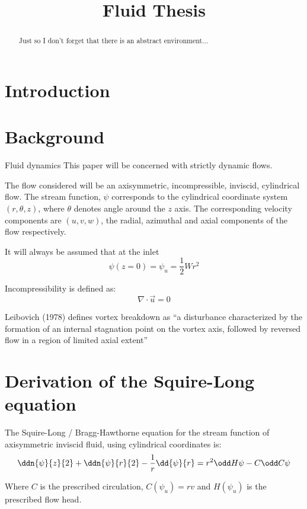 \documentclass{X:/Documents/Coding/Latex/myreport}
\title{Fluid Thesis}
\begin{document}
\maketitle
\begin{abstract}
    Just so I don't forget that there is an abstract environment...
\end{abstract}
\clearpage
\tableofcontents
\section{Introduction}

\section{Background}
Fluid dynamics 
This paper will be concerned with strictly dynamic flows.


The flow considered will be an axisymmetric, incompressible, inviscid, cylindrical flow. The stream function, $\psi$ corresponds to the cylindrical coordinate system $(r,\theta,z)$, where $\theta$ denotes angle around the $z$ axis. The corresponding velocity components are $(u,v,w)$, the radial, azimuthal and axial components of the flow respectively. 

It will always be assumed that at the inlet 
\[\psi(z=0) = \psi_{u} = \frac12 W r^2\]

Incompressibility is defined as:
\[\nabla \cdot \vec u = 0 \]






Leibovich (1978) defines vortex breakdown as ``a disturbance characterized
by the formation of an internal stagnation point on the vortex axis, followed by
reversed flow in a region of limited axial extent''


\section{Derivation of the Squire-Long equation}
The Squire-Long / Bragg-Hawthorne equation for the stream function of axisymmetric inviscid fluid, using cylindrical coordinates is:
\[\ddn{\psi}{z}{2} + \ddn{\psi}{r}{2} - \frac1r \dd{\psi}{r} = r^2 \odd H\psi - C \odd C\psi\]

Where $C$ is the prescribed circulation, $C(\psi_{u}) = rv$ and $H(\psi_{u})$ is the prescribed flow head. 
\end{document}
